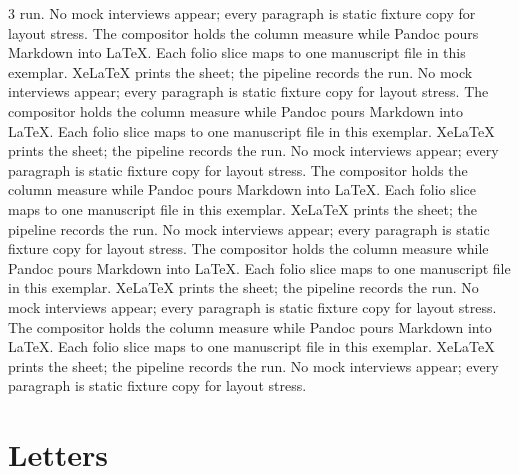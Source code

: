 \documentclass[
]{article}
\begin{document}
\begin{multicols}{3}
run. No mock interviews appear; every paragraph is static fixture copy
for layout stress. The compositor holds the column measure while Pandoc
pours Markdown into LaTeX. Each folio slice maps to one manuscript file
in this exemplar. XeLaTeX prints the sheet; the pipeline records the
run. No mock interviews appear; every paragraph is static fixture copy
for layout stress. The compositor holds the column measure while Pandoc
pours Markdown into LaTeX. Each folio slice maps to one manuscript file
in this exemplar. XeLaTeX prints the sheet; the pipeline records the
run. No mock interviews appear; every paragraph is static fixture copy
for layout stress. The compositor holds the column measure while Pandoc
pours Markdown into LaTeX. Each folio slice maps to one manuscript file
in this exemplar. XeLaTeX prints the sheet; the pipeline records the
run. No mock interviews appear; every paragraph is static fixture copy
for layout stress. The compositor holds the column measure while Pandoc
pours Markdown into LaTeX. Each folio slice maps to one manuscript file
in this exemplar. XeLaTeX prints the sheet; the pipeline records the
run. No mock interviews appear; every paragraph is static fixture copy
for layout stress. The compositor holds the column measure while Pandoc
pours Markdown into LaTeX. Each folio slice maps to one manuscript file
in this exemplar. XeLaTeX prints the sheet; the pipeline records the
run. No mock interviews appear; every paragraph is static fixture copy
for layout stress.

\end{multicols}

\newpage

\section{Letters}\label{letters}
\end{document}
